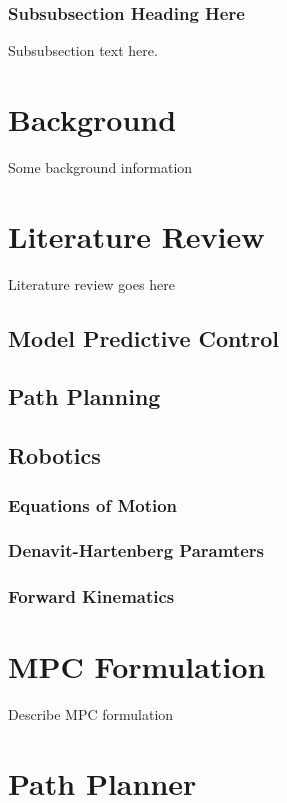 \documentclass[journal]{IEEEtran}
\begin{document}
\subsubsection{Subsubsection Heading Here}
Subsubsection text here.


\section{Background}

Some background information
\section{Literature Review}
Literature review goes here

\subsection{Model Predictive Control}

\subsection{Path Planning}

\subsection{Robotics}

\subsubsection{Equations of Motion}

\subsubsection{Denavit-Hartenberg Paramters}

\subsubsection{Forward Kinematics}



\section{MPC Formulation}

Describe MPC formulation

\section{Path Planner}
\end{document}
